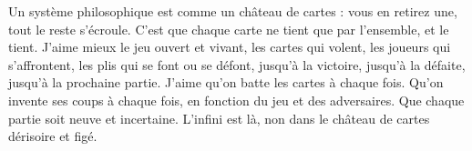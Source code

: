 Un système philosophique est comme un château de cartes : vous en retirez
une, tout le reste s’écroule. C’est que chaque carte ne tient que par l’ensemble,
et le tient. J'aime mieux le jeu ouvert et vivant, les cartes qui volent, les joueurs
qui s'affrontent, les plis qui se font ou se défont, jusqu’à la victoire, jusqu’à la
défaite, jusqu’à la prochaine partie. J’aime qu’on batte les cartes à chaque fois.
Qu'on invente ses coups à chaque fois, en fonction du jeu et des adversaires.
Que chaque partie soit neuve et incertaine. L’infini est là, non dans le château
de cartes dérisoire et figé.

